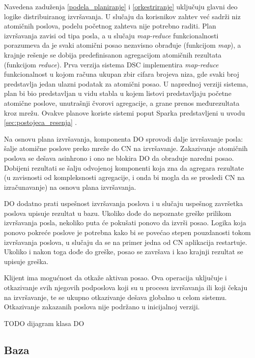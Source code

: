 \documentclass[12pt,oneside]{memoir}
\begin{document}
Navedena zaduženja \ref{podela_planiranje} i \ref{orkestriranje} uključuju glavni deo logike distribuiranog izvršavanja. U slučaju da korisnikov zahtev već sadrži niz atomičnih poslova, podelu početnog zahteva nije potrebno raditi. Plan izvršavanja zavisi od tipa posla, a u slučaju \emph{map-reduce} funkcionalnosti porazumeva da je svaki atomični posao nezavisno obrađuje (funkcijom \emph{map}), a krajnje rešenje se dobija predefinisanon agregacijom atomičnih rezultata (funkcijom \emph{reduce}). Prva verzija sistema DSC implementira \emph{map-reduce} funkcionalnost u kojom računa ukupan zbir cifara brojeva niza, gde svaki broj predstavlja jedan ulazni podatak za atomični posao. U naprednoj verziji sistema, plan bi bio predstavljan u vidu stabla u kojem listovi predstavljaju početne atomične poslove, unutrašnji čvorovi agregacije, a grane prenos međurezultata kroz mrežu. Ovakve planove koriste sistemi poput Sparka \cite{Spark} predstavljeni u uvodu \ref{sec:postojeca_resenja} .

Na osnovu plana izvršavanja, komponenta DO sprovodi dalje izvršavanje posla: šalje atomične poslove preko mreže do CN na izvršavanje. Zakazivanje atomičnih poslova se dešava asinhrono i ono ne blokira DO da obraduje naredni posao. Dobijeni rezultati se šalju odvojenoj komponenti koja zna da agregara rezultate (u zavisnosti od kompleksnosti agregacije, i onda bi mogla da se prosledi CN na izračunavanje) na osnovu plana izvršavanja.

DO dodatno prati uspešnost izvršavanja poslova i u slučaju uspešnog završetka poslova upisuje rezultat u bazu. Ukoliko dođe do nepoznate greške prilikom izvršavanja posla, nekoliko puta će pokušati ponovo da izvrši posao. Logika koja ponovo pokreće poslove je potrebna kako bi se povećao stepen pouzdanosti tokom izvršavanja poslova, u slučaju da se na primer jedna od CN aplikacija restartuje. Ukoliko i nakon toga dođe do greške, posao se završava i kao krajnji rezultat se upisuje greška.

Klijent ima mogućnost da otkaže aktivan posao. Ova operacija uključuje i otkazivanje svih njegovih podposlova koji su u procesu izvršavanja ili koji čekaju na izvršavanje, te se ukupno otkazivanje dešava globalno u celom sistemu. Otkazivanje zakazanih poslova nije podržano u inicijalnoj verziji.

TODO dijagram klasa DO

\subsection{Baza}
\end{document}
